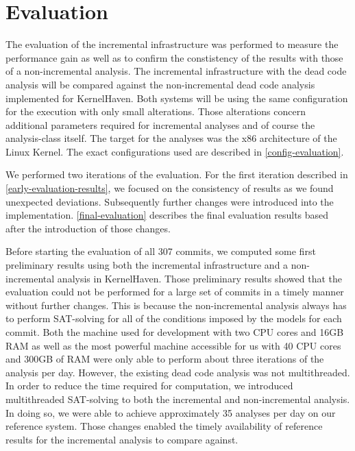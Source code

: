 \documentclass[a4paper]{article}
\begin{document}
\newpage
\section{Evaluation}\label{evaluation}

The evaluation of the incremental infrastructure was performed to measure the performance gain as well as to confirm the constistency of the results with those of a non-incremental analysis. The incremental infrastructure with the dead code analysis will be compared against the non-incremental dead code analysis implemented for KernelHaven. Both systems will be using the same configuration for the execution with only small alterations. Those alterations concern additional parameters required for incremental analyses and of course the analysis-class itself. The target for the analyses was the x86 architecture of the Linux Kernel. The exact configurations used are described in \autoref{config-evaluation}.

We performed two iterations of the evaluation. For the first iteration described in \autoref{early-evaluation-results}, we focused on the consistency of results as we found unexpected deviations. Subsequently further changes were introduced into the implementation. \autoref{final-evaluation} describes the final evaluation results based after the introduction of those changes.

Before starting the evaluation of all 307 commits, we computed some first preliminary results using both the incremental infrastructure and a non-incremental analysis in KernelHaven. Those preliminary results showed that the evaluation could not be performed for a large set of commits in a timely manner without further changes. This is because the non-incremental analysis always has to perform SAT-solving for all of the conditions imposed by the models for each commit. Both the machine used for development with two CPU cores and 16GB RAM as well as the most powerful machine accessible for us with 40 CPU cores and 300GB of RAM were only able to perform about three iterations of the analysis per day. However, the existing dead code analysis was not multithreaded. In order to reduce the time required for computation, we introduced multithreaded SAT-solving to both the incremental and non-incremental analysis. In doing so, we were able to achieve approximately 35 analyses per day on our reference system. Those changes enabled the timely availability of reference results for the incremental analysis to compare against.
\end{document}
